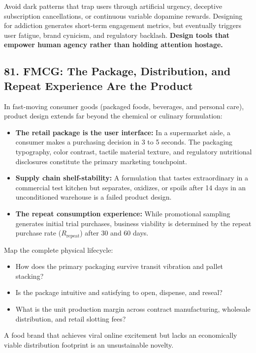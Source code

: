 Avoid dark patterns that trap users through artificial urgency, deceptive subscription cancellations, or continuous variable dopamine rewards. Designing for addiction generates short-term engagement metrics, but eventually triggers user fatigue, brand cynicism, and regulatory backlash. \textbf{Design tools that empower human agency rather than holding attention hostage.}

\subsection*{81. FMCG: The Package, Distribution, and Repeat Experience Are the Product}

In fast-moving consumer goods (packaged foods, beverages, and personal care), product design extends far beyond the chemical or culinary formulation:
\begin{itemize}
    \item \textbf{The retail package is the user interface:} In a supermarket aisle, a consumer makes a purchasing decision in 3 to 5 seconds. The packaging typography, color contrast, tactile material texture, and regulatory nutritional disclosures constitute the primary marketing touchpoint.
    \item \textbf{Supply chain shelf-stability:} A formulation that tastes extraordinary in a commercial test kitchen but separates, oxidizes, or spoils after 14 days in an unconditioned warehouse is a failed product design.
    \item \textbf{The repeat consumption experience:} While promotional sampling generates initial trial purchases, business viability is determined by the repeat purchase rate ($R_{\text{repeat}}$) after 30 and 60 days.
\end{itemize}

Map the complete physical lifecycle:
\begin{itemize}
    \item How does the primary packaging survive transit vibration and pallet stacking?
    \item Is the package intuitive and satisfying to open, dispense, and reseal?
    \item What is the unit production margin across contract manufacturing, wholesale distribution, and retail slotting fees?
\end{itemize}

A food brand that achieves viral online excitement but lacks an economically viable distribution footprint is an unsustainable novelty.
